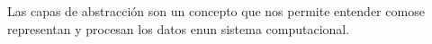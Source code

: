 \documentclass[preview]{standalone}
\begin{document}
\begin{center}
Las capas de abstracción son un
concepto que nos permite entender comose representan y procesan los datos enun sistema computacional.
\end{center}
\end{document}
